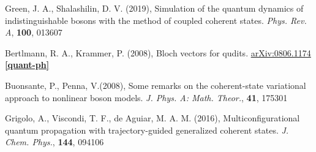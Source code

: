 \documentclass[12pt]{article}
\begin{document}
\begin{thebibliography}{10}
	Green, J. A., Shalashilin, D. V. (2019), Simulation of the quantum dynamics of indistinguishable bosons with the method of coupled coherent states. \textit{Phys. Rev. A}, \textbf{100}, 013607
	
	Bertlmann, R. A., Krammer, P. (2008), Bloch vectors for qudits. \href{ 	
https://doi.org/10.48550/arXiv.0806.1174}{arXiv:0806.1174 \textbf{[quant-ph]}}

	Buonsante, P., Penna, V.(2008), Some remarks on the coherent-state variational approach to nonlinear boson models. \textit{J. Phys. A: Math. Theor.}, \textbf{41}, 175301
	
	Grigolo, A., Viscondi, T. F., de Aguiar, M. A. M. (2016), Multiconfigurational quantum propagation with trajectory-guided generalized coherent states. \textit{J. Chem. Phys.}, \textbf{144}, 094106

	\end{thebibliography}
	
	
	
	
	

	
	
\end{document}
